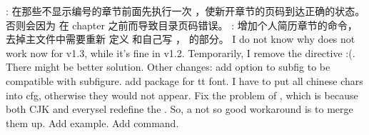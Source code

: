 {}\markdownRendererInterblockSeparator
{}\markdownRendererUlBegin
\markdownRendererUlItem {}: 在那些不显示编号的章节前面先执行一次 ，使新开章节的页码到达正确的状态。否则会因为  在 chapter 之前而导致目录页码错误。\markdownRendererUlItemEnd 
\markdownRendererUlItem {}: 增加个人简历章节的命令，去掉主文件中需要重新 定义  和自己写 ， 的部分。\markdownRendererUlItemEnd 
\markdownRendererUlEnd \markdownRendererInterblockSeparator
{}\markdownRendererInterblockSeparator
{}\markdownRendererInterblockSeparator
{}\markdownRendererUlBegin
\markdownRendererUlItem I do not know why  does not work now for v1.3, while it's fine in v1.2. Temporarily, I remove the directive :(. There might be better solution. Other changes: add  option to subfig to be compatible with subfigure. add  package for tt font.\markdownRendererUlItemEnd 
\markdownRendererUlItem I have to put all chinese chars into cfg, otherwise they would not appear.\markdownRendererUlItemEnd 
\markdownRendererUlEnd \markdownRendererInterblockSeparator
{}\markdownRendererInterblockSeparator
{}\markdownRendererInterblockSeparator
{}\markdownRendererUlBegin
\markdownRendererUlItem Fix the problem of , which is because both CJK and everysel redefine the . So, a not so good workaround is to merge them up. Add  example. Add  command.\markdownRendererUlItemEnd 
\markdownRendererUlEnd \markdownRendererInterblockSeparator

